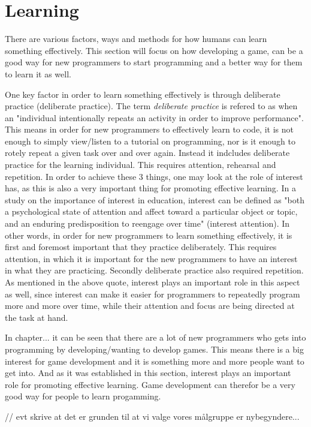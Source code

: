 \chapter{Learning} \label{chap:analysis}


There are various factors, ways and methods for how humans can learn something effectively. 
This section will focus on how developing a game, can be a good way for new programmers to start programming and a better way for them to learn it as well.\newline

One key factor in order to learn something effectively is through deliberate practice (deliberate practice). The term \emph{deliberate practice} is refered to as when an "individual intentionally repeats an activity in order to improve performance". 
This means in order for new programmers to effectively learn to code, it is not enough to simply view/listen to a tutorial on programming, nor is it enough to rotely repeat a given task over and over again. Instead it indcludes deliberate practice for the learning individual. This requires attention, rehearsal and repetition. 
In order to achieve these 3 things, one may look at the role of interest has, as this is also a very important thing for promoting effective learning. In a study on the importance of interest in education, interest can be defined as "both a psychological state of attention and affect toward a particular object or topic, and an enduring predisposition to reengage over time" (interest attention).
In other words, in order for new programmers to learn something effectively, it is first and foremost important that they practice deliberately. This requires attention, in which it is important for the new programmers to have an interest in what they are practicing. 
Secondly deliberate practice also required repetition. As mentioned in the above quote, interest plays an important role in this aspect as well, since interest can make it easier for programmers to repeatedly program more and more over time, while their attention and focus are being directed at the task at hand.\newline

In chapter... it can be seen that there are a lot of new programmers who gets into programming by developing/wanting to develop games. This means there is a big interest for game development and it is something more and more people want to get into. And as it was established in this section, interest plays an important role for promoting effective learning.
Game development can therefor be a very good way for people to learn progamming. 

// evt skrive at det er grunden til at vi valge vores målgruppe er nybegyndere...
